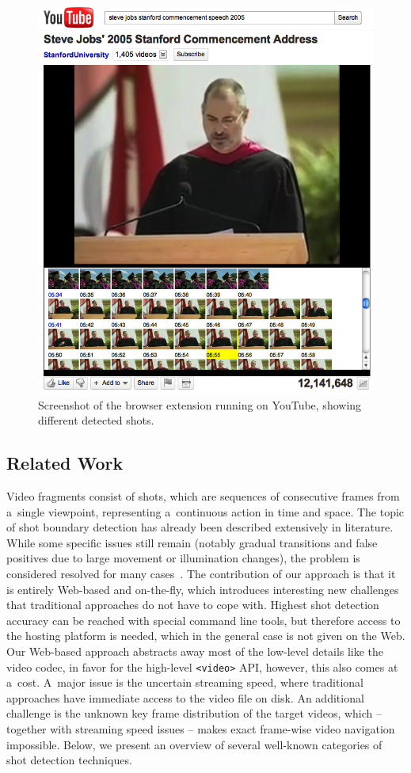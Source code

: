 \begin{figure}
\begin{center}
   \includegraphics[width=0.8\linewidth]{./stevejobs.png}
\end{center}
   \caption{Screenshot of the browser extension running on YouTube, showing different detected shots.}
\label{fig:screenshot}
\end{figure}

\subsection{Related Work} \label{sec:related-work}
Video fragments consist of shots, which are sequences of consecutive frames from a~single viewpoint, representing a~continuous action in time and space. The topic of shot boundary detection has already been described extensively in literature. While some specific issues still remain (notably gradual transitions and false positives due to large movement or illumination changes), the problem is considered resolved for many cases~\cite{Hanjalic2002, Yuan2007}.
The contribution of our approach is that it is entirely Web-based and on-the-fly, which introduces interesting new challenges that traditional approaches do not have to cope with.
Highest shot detection accuracy can be reached with special command line tools, but therefore access to the hosting platform is needed, which in the general case is not given on the Web.
Our Web-based approach abstracts away most of the low-level details like the video codec, in favor for the high-level \texttt{<video>} API, however, this also comes at a~cost.
A~major issue is the uncertain streaming speed, where traditional approaches have immediate access to the video file on disk.
An additional challenge is the unknown key frame distribution of the target videos, which -- together with streaming speed issues -- makes exact frame-wise video navigation impossible.
Below, we present an overview of several well-known categories of shot detection techniques.

